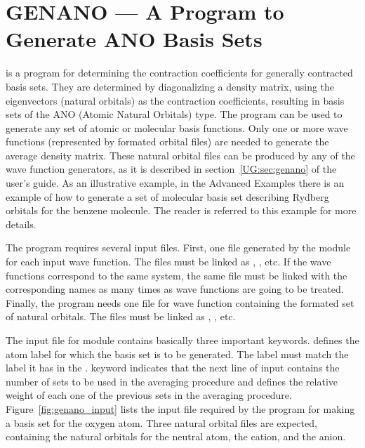 \section{GENANO --- A Program to Generate ANO Basis Sets}
\label{TUT:sec:genano}

 is a program for determining the contraction coefficients for
generally contracted basis sets. They are determined by diagonalizing a density 
matrix, using the eigenvectors (natural orbitals) as the contraction 
coefficients, resulting in basis sets of the ANO (Atomic Natural Orbitals) type.
The program can be used to generate any set of atomic or molecular basis 
functions. Only one or more wave functions (represented by formated orbital 
files) are needed to generate the average density matrix. These natural orbital 
files can be produced by any of the wave function generators, as it is described
in section~\ref{UG:sec:genano} of the user's guide. As an illustrative example, 
in the Advanced Examples there is an example of how to 
generate a set of molecular basis set describing Rydberg orbitals for the 
benzene molecule. The reader is referred to this example for more details.

The  program requires several input files. First, one 
 file generated by the  module for each input wave 
function. The files must be linked as , , etc. If the 
wave functions correspond to the same system, the same  file must 
be linked with the corresponding names as many times as wave functions are 
going to be treated. Finally, the program needs one file for wave function 
containing the formated set of natural orbitals. The files must be linked as 
, , etc.

The input file for module  contains basically three important
keywords.  defines the atom label for which the basis set is to 
be generated. The label must match the label it has in the .
 keyword indicates that the next line of input contains the 
number of sets to be used in the averaging procedure and  
defines the relative weight of each one of the previous sets in the averaging 
procedure. Figure~\ref{fig:genano_input} lists the input file required by the
 program for making a basis set for the oxygen atom. Three 
natural orbital files are expected, containing the natural orbitals for the 
neutral atom, the cation, and the anion.

